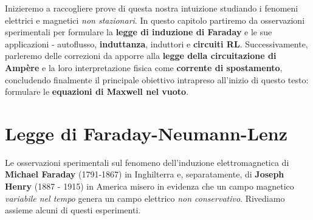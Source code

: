 Inizieremo a raccogliere prove di questa nostra intuizione studiando i fenomeni elettrici e magnetici \textit{non stazionari}. In questo capitolo partiremo da osservazioni sperimentali per formulare la \textbf{legge di induzione di Faraday} e le sue applicazioni - autoflusso, \textbf{induttanza}, induttori e \textbf{circuiti RL}. Successivamente, parleremo delle correzioni da apporre alla \textbf{legge della circuitazione di Ampère} e la loro interpretazione fisica come \textbf{corrente di spostamento}, concludendo finalmente il principale obiettivo intrapreso all'inizio di questo testo: formulare le \textbf{equazioni di Maxwell nel vuoto}.

\section{Legge di Faraday-Neumann-Lenz}
Le osservazioni sperimentali sul fenomeno dell'induzione elettromagnetica di \textbf{Michael Faraday} (1791-1867) in Inghilterra e, separatamente, di \textbf{Joseph Henry} (1887 - 1915) in America misero in evidenza che un campo magnetico \textit{variabile nel tempo} genera un campo elettrico \textit{non conservativo}. Rivediamo assieme alcuni di questi esperimenti.
